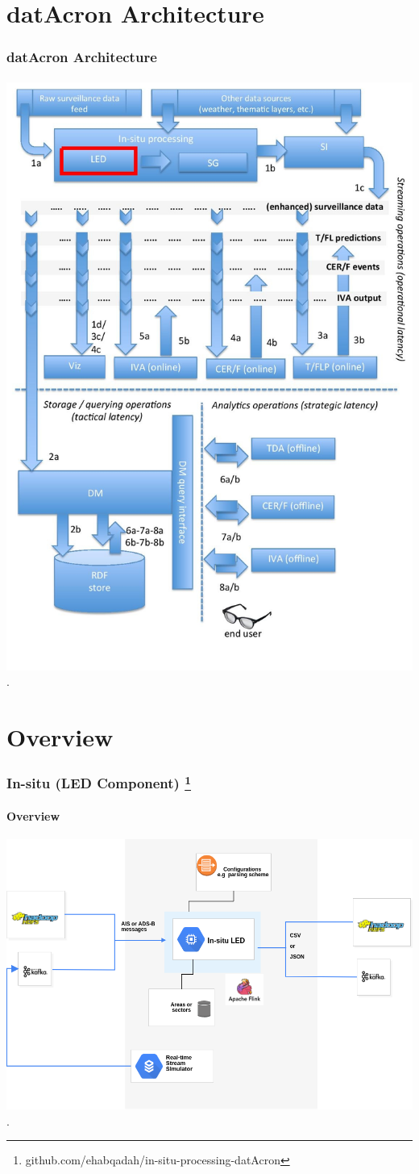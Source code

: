 

\section{datAcron Architecture}		
\frame
{		
	\frametitle{datAcron Architecture}
	\framesubtitle{}
	
	\begin{center}
		\includegraphics[width=.85\textwidth,height=.75\linewidth]{figures/arch1.jpg}\\
		.
	\end{center}
	
}

\section{Overview}
\frame
{
	\frametitle{In-situ (LED Component) \footnote{ github.com/ehabqadah/in-situ-processing-datAcron}}
	\framesubtitle{Overview}
		\begin{center}
			\includegraphics[scale=.32,left]{figures/insitu.png}\\
			.
		\end{center}
}


